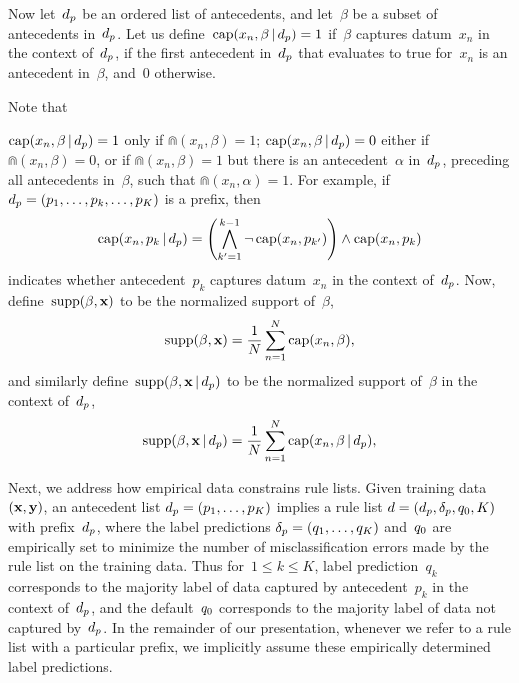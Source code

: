 Now let~$d_p$ be an ordered list of antecedents,
and let~$\beta$ be a subset of antecedents in~$d_p$.
%
Let us define~${\textnormal{cap}(x_n, \beta \,|\, d_p) = 1}$ if~$\beta$
captures datum~$x_n$ in the context of~$d_p$,
\ie if the first antecedent in~$d_p$ that evaluates to true for~$x_n$
is an antecedent in~$\beta$, and~0 otherwise.
%
\begin{arxiv}
Note that
\end{arxiv}
${\textnormal{cap}(x_n, \beta \,|\, d_p) = 1}$ only if ${\Cap(x_n, \beta) = 1}$;
${\textnormal{cap}(x_n, \beta \,|\, d_p) = 0}$ either if ${\Cap(x_n, \beta) = 0}$,
or if ${\Cap(x_n, \beta) = 1}$ but there is an antecedent~$\alpha$ in~$d_p$,
preceding all antecedents in~$\beta$, such that ${\Cap(x_n, \alpha) = 1}$.
%
For example, if ${d_p = (p_1, \dots, p_k, \dots, p_K)}$ is a prefix, then
\begin{align}
\Cap(x_n, p_k \given \Prefix) =
  \left(\bigwedge_{k'=1}^{k - 1} \neg\, \Cap(x_n, p_{k'}) \right)
  \wedge \Cap(x_n, p_k)
\end{align}
indicates whether antecedent~$p_k$ captures datum~$x_n$ in the context of~$d_p$.
%
Now, define~${\textnormal{supp}(\beta, \mathbf{x})}$ to be the normalized support of~$\beta$,
\begin{align}
\Supp(\beta, \x) = \frac{1}{N} \sum_{n=1}^N \Cap(x_n, \beta),
\label{eq:support}
\end{align}
and similarly define~${\textnormal{supp}(\beta, \mathbf{x} \,|\, d_p)}$
to be the normalized support of~$\beta$ in the context of~$d_p$,
\begin{align}
\Supp(\beta, \x \given \Prefix) = \frac{1}{N} \sum_{n=1}^N \Cap(x_n, \beta \given \Prefix),
\label{eq:support-context}
\end{align}

Next, we address how empirical data constrains rule lists.
%
Given training data~${(\mathbf{x}, \mathbf{y})}$,
an antecedent list ${d_p = (p_1, \dots, p_K)}$
implies a rule list ${{d} = (d_p, \delta_p, q_0, K)}$
with prefix~$d_p$, where the label predictions
${\delta_p = (q_1, \dots, q_K)}$ and~$q_0$ are empirically set
to minimize the number of misclassification errors made by
the rule list on the training data.
%
Thus for~${1 \le k \le K}$, label prediction~$q_k$ corresponds to the
majority label of data captured by antecedent~$p_k$ in the context of~$d_p$,
and the default~$q_0$ corresponds to the majority label of data
not captured by~$d_p$.
%
In the remainder of our presentation, whenever we refer to a rule list with a
particular prefix, we implicitly assume these empirically determined label predictions.

